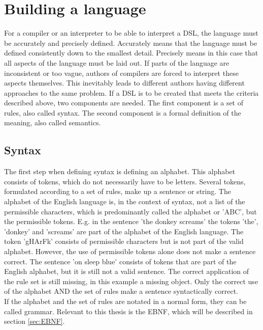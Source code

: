 \section{Building a language}
For a compiler or an interpreter to be able to interpret a \ac{DSL}, the language must be accurately and precisely defined. Accurately means that the language must be defined consistently down to the smallest detail. Precisely means in this case that all aspects of the language must be laid out. If parts of the language are inconsistent or too vague, authors of compilers are forced to interpret these aspects themselves. This inevitably leads to different authors having different approaches to the same problem. If a \ac{DSL} is to be created that meets the criteria described above, two components are needed. The first component is a set of rules, also called syntax. The second component is a formal definition of the meaning, also called semantics. \parencite[cf.][p. 2]{farrell_compiler_1995}
\subsection{Syntax}
The first step when defining syntax is defining an alphabet. This alphabet consists of tokens, which do not necessarily have to be letters. Several tokens, formulated according to a set of rules, make up a sentence or string. The alphabet of the English language is, in the context of syntax, not a list of the permissible characters, which is predominantly called the alphabet or 'ABC', but the permissible tokens.
E.g. in the sentence 'the donkey screams' the tokens 'the', 'donkey' and 'screams' are part of the alphabet of the English language. The token 'gHArFk' consists of permissible characters but is not part of the valid alphabet. However, the use of permissible tokens alone does not make a sentence correct. The sentence 'on sleep blue' consists of tokens that are part of the English alphabet, but it is still not a valid sentence. The correct application of the rule set is still missing, in this example a missing object. Only the correct use of the alphabet AND the set of rules make a sentence syntactically correct. \parencite[cf.][p. 2]{farrell_compiler_1995}\\
If the alphabet and the set of rules are notated in a normal form, they can be called grammar. Relevant to this thesis is the \ac{EBNF}, which will be described in section \ref{sec:EBNF}.
